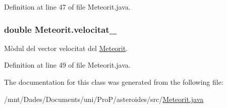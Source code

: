 Definition at line 47 of file Meteorit.\+java.

\hypertarget{class_meteorit_a6d567bfb1f4d118c6c36c7bff76ec28a}{}
\subsubsection[{velocitat\+\_\+}]{\setlength{\rightskip}{0pt plus 5cm}double Meteorit.\+velocitat\+\_\+\hspace{0.3cm}{\ttfamily [private]}}\label{class_meteorit_a6d567bfb1f4d118c6c36c7bff76ec28a}


Mòdul del vector velocitat del \hyperlink{class_meteorit}{Meteorit}. 



Definition at line 49 of file Meteorit.\+java.



The documentation for this class was generated from the following file\+:\begin{DoxyCompactItemize}
\item 
/mnt/\+Dades/\+Documents/uni/\+Pro\+P/asteroides/src/\hyperlink{_meteorit_8java}{Meteorit.\+java}\end{DoxyCompactItemize}

